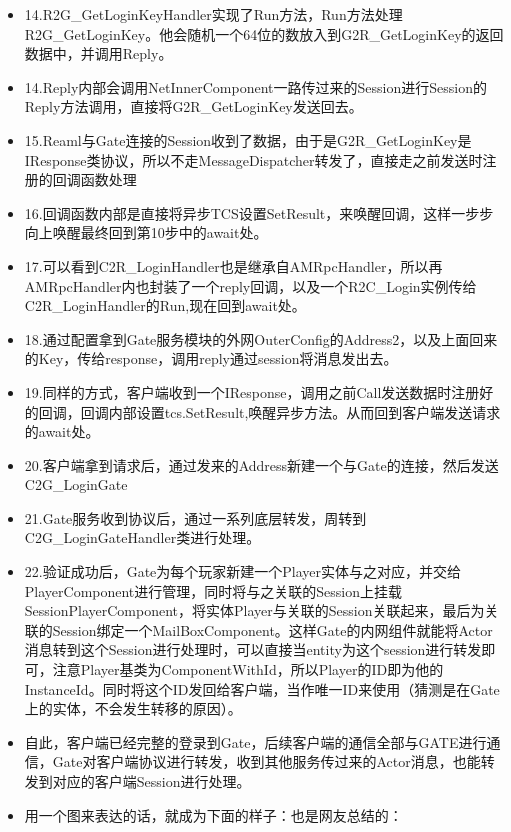 \documentclass[9pt, b5paper]{article}
\begin{document}
\begin{itemize}
\item 14.R2G\_GetLoginKeyHandler实现了Run方法，Run方法处理R2G\_GetLoginKey。他会随机一个64位的数放入到G2R\_GetLoginKey的返回数据中，并调用Reply。
\item 14.Reply内部会调用NetInnerComponent一路传过来的Session进行Session的Reply方法调用，直接将G2R\_GetLoginKey发送回去。
\item 15.Reaml与Gate连接的Session收到了数据，由于是G2R\_GetLoginKey是IResponse类协议，所以不走MessageDispatcher转发了，直接走之前发送时注册的回调函数处理
\item 16.回调函数内部是直接将异步TCS设置SetResult，来唤醒回调，这样一步步向上唤醒最终回到第10步中的await处。
\item 17.可以看到C2R\_LoginHandler也是继承自AMRpcHandler，所以再AMRpcHandler内也封装了一个reply回调，以及一个R2C\_Login实例传给C2R\_LoginHandler的Run,现在回到await处。
\item 18.通过配置拿到Gate服务模块的外网OuterConfig的Address2，以及上面回来的Key，传给response，调用reply通过session将消息发出去。
\item 19.同样的方式，客户端收到一个IResponse，调用之前Call发送数据时注册好的回调，回调内部设置tcs.SetResult,唤醒异步方法。从而回到客户端发送请求的await处。
\item 20.客户端拿到请求后，通过发来的Address新建一个与Gate的连接，然后发送C2G\_LoginGate
\item 21.Gate服务收到协议后，通过一系列底层转发，周转到C2G\_LoginGateHandler类进行处理。
\item 22.验证成功后，Gate为每个玩家新建一个Player实体与之对应，并交给PlayerComponent进行管理，同时将与之关联的Session上挂载SessionPlayerComponent，将实体Player与关联的Session关联起来，最后为关联的Session绑定一个MailBoxComponent。这样Gate的内网组件就能将Actor消息转到这个Session进行处理时，可以直接当entity为这个session进行转发即可，注意Player基类为ComponentWithId，所以Player的ID即为他的InstanceId。同时将这个ID发回给客户端，当作唯一ID来使用（猜测是在Gate上的实体，不会发生转移的原因）。
\item 自此，客户端已经完整的登录到Gate，后续客户端的通信全部与GATE进行通信，Gate对客户端协议进行转发，收到其他服务传过来的Actor消息，也能转发到对应的客户端Session进行处理。
\item 用一个图来表达的话，就成为下面的样子：也是网友总结的：
\end{itemize}
\end{document}
